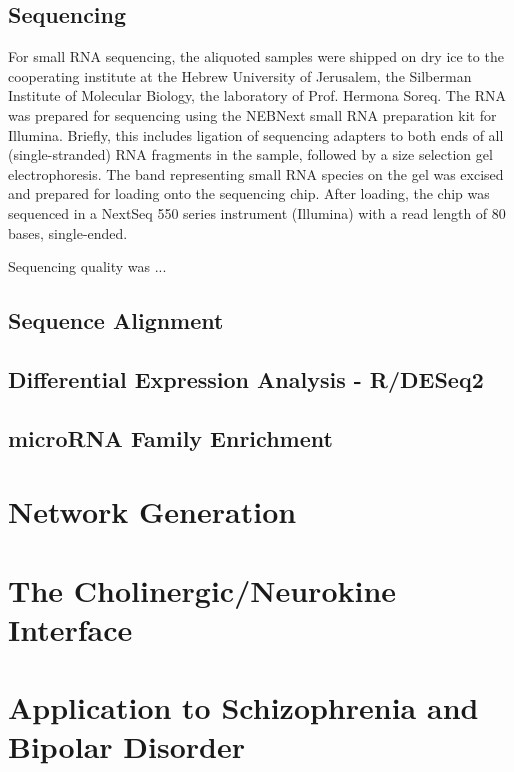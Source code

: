 \subsection{Sequencing}
For small RNA sequencing, the aliquoted samples were shipped on dry ice to the cooperating institute at the Hebrew University of Jerusalem, the Silberman Institute of Molecular Biology, the laboratory of Prof. Hermona Soreq. The RNA was prepared for sequencing using the NEBNext small RNA preparation kit for Illumina. Briefly, this includes ligation of sequencing adapters to both ends of all (single-stranded) RNA fragments in the sample, followed by a size selection gel electrophoresis. The band representing small RNA species on the gel was excised and prepared for loading onto the sequencing chip. After loading, the chip was sequenced in a NextSeq 550 series instrument (Illumina) with a read length of 80 bases, single-ended.

Sequencing quality was ...

\subsection{Sequence Alignment}

\subsection{Differential Expression Analysis - R/DESeq2}

\subsection{microRNA Family Enrichment}

\section{Network Generation}

\section{The Cholinergic/Neurokine Interface}

\section{Application to Schizophrenia and Bipolar Disorder}
